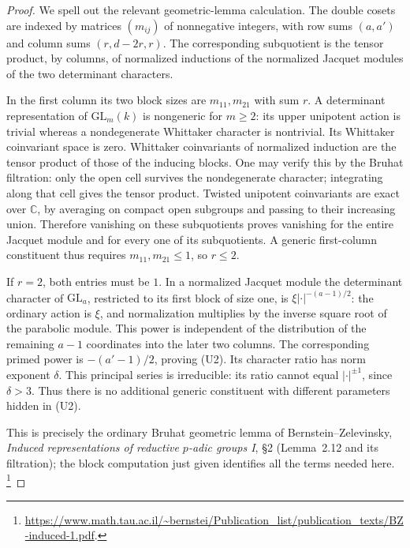 \begin{proof}
We spell out the relevant geometric-lemma calculation.
The double cosets are indexed by matrices
\((m_{ij})\) of nonnegative integers, with row sums
\((a,a')\) and column sums \((r,d-2r,r)\).
The corresponding subquotient is the tensor product, by columns,
of normalized inductions of the normalized Jacquet modules
of the two determinant characters.

In the first column its two block sizes are \(m_{11},m_{21}\)
with sum \(r\). A determinant representation of
\(\mathrm{GL}_m(k)\) is nongeneric for \(m\ge2\):
its upper unipotent action is trivial whereas a nondegenerate
Whittaker character is nontrivial. Its Whittaker coinvariant
space is zero.
Whittaker coinvariants of normalized induction are the tensor
product of those of the inducing blocks. One may verify this
by the Bruhat filtration: only the open cell survives the
nondegenerate character; integrating along that cell gives the
tensor product. Twisted unipotent coinvariants are exact over
\(\mathbb C\), by averaging on compact open subgroups and
passing to their increasing union. Therefore vanishing on
these subquotients proves vanishing for the entire Jacquet
module and for every one of its subquotients.
A generic first-column constituent thus requires
\(m_{11},m_{21}\le1\), so \(r\le2\).

If \(r=2\), both entries must be \(1\).
In a normalized Jacquet module the determinant character of
\(\mathrm{GL}_a\), restricted to its first block of size one,
is \(\xi|\cdot|^{-(a-1)/2}\): the ordinary action is \(\xi\),
and normalization multiplies by the inverse square root of
the parabolic module. This power is independent of the
distribution of the remaining \(a-1\) coordinates into the
later two columns. The corresponding primed power is
\(-(a'-1)/2\), proving (U2).
Its character ratio has norm exponent \(\delta\).
This principal series is irreducible: its ratio cannot equal
\(|\cdot|^{\pm1}\), since \(\delta>3\).
Thus there is no additional generic constituent with different
parameters hidden in (U2).

This is precisely the ordinary Bruhat geometric lemma of
Bernstein--Zelevinsky, \emph{Induced representations of reductive
\(p\)-adic groups I}, \S2 (Lemma~2.12 and its filtration);
the block computation just given identifies all the terms
needed here.
\footnote{\url{https://www.math.tau.ac.il/~bernstei/Publication_list/publication_texts/BZ-induced-1.pdf}.}
\end{proof}

